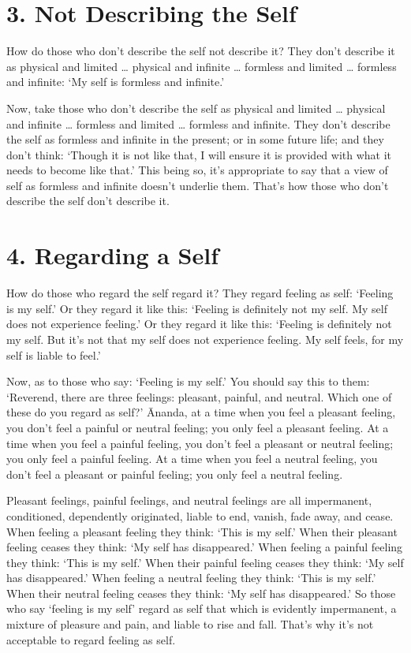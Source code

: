 \documentclass[12pt,openany]{book}%
\begin{document}
\section*{3. Not Describing the Self }

How do those who don’t describe the self not describe it? They don’t describe it as physical and limited … physical and infinite … formless and limited … formless and infinite: ‘My self is formless and infinite.’ 

Now, take those who don’t describe the self as physical and limited … physical and infinite … formless and limited … formless and infinite. They don’t describe the self as formless and infinite in the present; or in some future life; and they don’t think: ‘Though it is not like that, I will ensure it is provided with what it needs to become like that.’ This being so, it’s appropriate to say that a view of self as formless and infinite doesn’t underlie them. That’s how those who don’t describe the self don’t describe it. 

\section*{4. Regarding a Self }

How do those who regard the self regard it? They regard feeling as self: ‘Feeling is my self.’ Or they regard it like this: ‘Feeling is definitely not my self. My self does not experience feeling.’ Or they regard it like this: ‘Feeling is definitely not my self. But it’s not that my self does not experience feeling. My self feels, for my self is liable to feel.’ 

Now, as to those who say: ‘Feeling is my self.’ You should say this to them: ‘Reverend, there are three feelings: pleasant, painful, and neutral. Which one of these do you regard as self?’ Ānanda, at a time when you feel a pleasant feeling, you don’t feel a painful or neutral feeling; you only feel a pleasant feeling. At a time when you feel a painful feeling, you don’t feel a pleasant or neutral feeling; you only feel a painful feeling. At a time when you feel a neutral feeling, you don’t feel a pleasant or painful feeling; you only feel a neutral feeling. 

Pleasant feelings, painful feelings, and neutral feelings are all impermanent, conditioned, dependently originated, liable to end, vanish, fade away, and cease. When feeling a pleasant feeling they think: ‘This is my self.’ When their pleasant feeling ceases they think: ‘My self has disappeared.’ When feeling a painful feeling they think: ‘This is my self.’ When their painful feeling ceases they think: ‘My self has disappeared.’ When feeling a neutral feeling they think: ‘This is my self.’ When their neutral feeling ceases they think: ‘My self has disappeared.’ So those who say ‘feeling is my self’ regard as self that which is evidently impermanent, a mixture of pleasure and pain, and liable to rise and fall. That’s why it’s not acceptable to regard feeling as self. 
\end{document}
